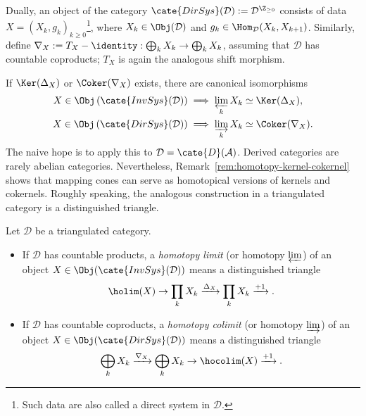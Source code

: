 Dually, an object of the category
$\cate{DirSys}(\mathcal{D}):=\mathcal{D}^{\Z_{\geq0}}$ consists of data
$X=(X_k,g_k)_{k\geq0}$\footnote{Such data are also called a direct system in
$\mathcal{D}$.}, where $X_k\in\Obj(\mathcal{D})$ and
$g_k\in\Hom_{\mathcal{D}}(X_k,X_{k+1})$. Similarly, define
$\nabla_X:=T_X-\identity:\bigoplus_kX_k\to\bigoplus_kX_k$, assuming that
$\mathcal{D}$ has countable coproducts; $T_X$ is again the analogous shift
morphism.

If $\Ker(\Delta_X)$ or $\Coker(\nabla_X)$ exists, there are canonical
isomorphisms
\begin{align*}
	X \in \Obj\left( \cate{InvSys}(\mathcal{D}) \right) & \implies \varprojlim_k X_k \simeq \Ker(\Delta_X), \\
	X \in \Obj\left( \cate{DirSys}(\mathcal{D}) \right) & \implies \varinjlim_k X_k \simeq \Coker(\nabla_X).
\end{align*}
The naive hope is to apply this to $\mathcal{D}=\cate{D}(\mathcal{A})$.
Derived categories are rarely abelian categories. Nevertheless,
Remark~\ref{rem:homotopy-kernel-cokernel} shows that mapping cones can serve as
homotopical versions of kernels and cokernels. Roughly speaking, the analogous
construction in a triangulated category is a distinguished triangle.

\begin{definition}\label{def:holim}
	Let $\mathcal{D}$ be a triangulated category.
	\begin{itemize}
		\item If $\mathcal{D}$ has countable products, a \emph{homotopy limit}
		(or homotopy $\varprojlim$) of an object
		$X\in\Obj(\cate{InvSys}(\mathcal{D}))$ means a distinguished triangle
		\[ \holim(X) \to \prod_k X_k \xrightarrow{\Delta_X} \prod_k X_k \xrightarrow{+1} . \]
		\item If $\mathcal{D}$ has countable coproducts, a \emph{homotopy
		colimit} (or homotopy $\varinjlim$) of an object
		$X\in\Obj(\cate{DirSys}(\mathcal{D}))$ means a distinguished triangle
		\[ \bigoplus_k X_k \xrightarrow{\nabla_X} \bigoplus_k X_k \to \hocolim(X) \xrightarrow{+1} . \]
	\end{itemize}
\end{definition}

